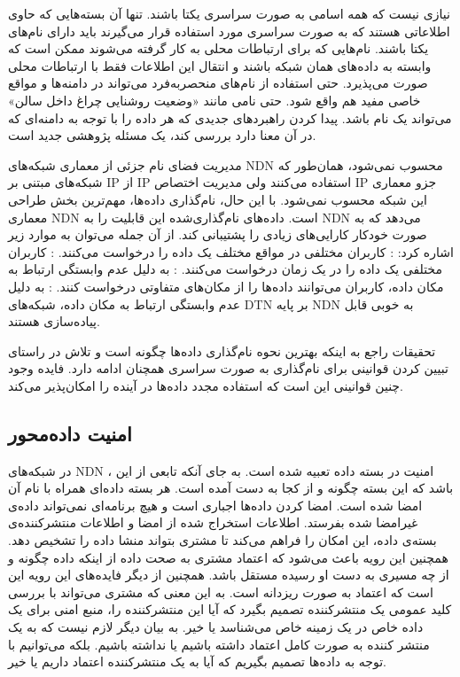 نیازی نیست که همه اسامی به صورت سراسری یکتا باشند. تنها آن بسته‌هایی که حاوی اطلاعاتی هستند که به صورت سراسری مورد استفاده قرار می‌گیرند باید دارای نام‌های یکتا باشند. نام‌‌هایی که برای ارتباطات محلی به کار گرفته می‌شوند ممکن است که وابسته به داده‌های همان شبکه باشند و انتقال این اطلاعات فقط با ارتباطات محلی صورت می‌پذیرد. حتی استفاده از نام‌های منحصربه‌فرد می‌تواند در دامنه‌ها و مواقع خاصی مفید هم واقع شود. حتی نامی مانند «وضعیت روشنایی چراغ داخل سالن» می‌تواند یک نام باشد. پیدا کردن راهبردهای جدیدی که هر داده را با توجه به دامنه‌ای که در ‌آن معنا دارد بررسی کند، یک مسئله پژوهشی جدید است. 

مدیریت فضای نام جزئی از معماری شبکه‌های NDN  محسوب نمی‌شود، همان‌طور که شبکه‌های مبتنی بر IP از IP استفاده می‌کنند ولی مدیریت اختصاص IP جزو معماری این شبکه محسوب نمی‌شود. با این حال، نام‌گذاری داده‌‌ها، مهم‌ترین بخش طراحی معماری NDN است. داده‌های نام‌گذاری‌شده این قابلیت را به NDN می‌دهد که به صورت خودکار کارایی‌های زیادی را پشتیبانی کند. از آن جمله می‌توان به موارد زیر اشاره کرد:
 : کاربران مختلفی در مواقع مختلف یک داده را درخواست می‌کنند. 
 : کاربران مختلفی یک داده را در یک زمان درخواست می‌کنند.
 :‌  به دلیل عدم وابستگی ارتباط به مکان داده، کاربران می‌توانند داده‌ها را از مکان‌های متفاوتی درخواست کنند. 
 : به دلیل عدم وابستگی ارتباط به مکان داده، شبکه‌های DTN بر پایه NDN به خوبی قابل پیاده‌سازی هستند. 

تحقیقات راجع به اینکه بهترین نحوه نام‌گذاری داده‌ها چگونه است و تلاش در راستای تبیین کردن قوانینی برای نام‌گذاری به صورت سراسری همچنان ادامه دارد. فایده وجود چنین قوانینی این است که استفاده مجدد داده‌ها در آینده را امکان‌پذیر می‌کند.  
\subsection{امنیت داده‌محور}
در شبکه‌های ‌NDN ، امنیت در بسته داده تعبیه شده است. به جای آنکه تابعی از این باشد که این بسته چگونه و از کجا به دست آمده است. 
\cite{nnt}
هر بسته داده‌ای همراه با نام آن امضا شده است. امضا کردن داده‌‌ها اجباری است و هیچ برنامه‌ای نمی‌تواند داده‌ی غیرامضا شده بفرستد. اطلاعات استخراج شده از  امضا و اطلاعات منتشرکننده‌ی بسته‌ی داده، این امکان را فراهم می‌کند تا مشتری بتواند منشا داده را تشخیص دهد. همچنین این رویه باعث می‌شود که  اعتماد مشتری به صحت داده از اینکه داده چگونه و از چه مسیری به دست او رسیده مستقل باشد. همچنین از دیگر فایده‌های این رویه این است که اعتماد به صورت ریزدانه است. به این معنی که مشتری می‌تواند با بررسی کلید عمومی یک منتشرکننده تصمیم بگیرد که آیا این منتشرکننده را، منبع امنی برای یک داده خاص در یک زمینه خاص می‌شناسد یا خیر. به بیان دیگر لازم نیست که به یک منتشر کننده به صورت کامل اعتماد داشته باشیم یا نداشته باشیم. بلکه می‌توانیم با توجه به داده‌ها تصمیم بگیریم که آیا به یک منتشرکننده اعتماد داریم یا خیر. 
 
